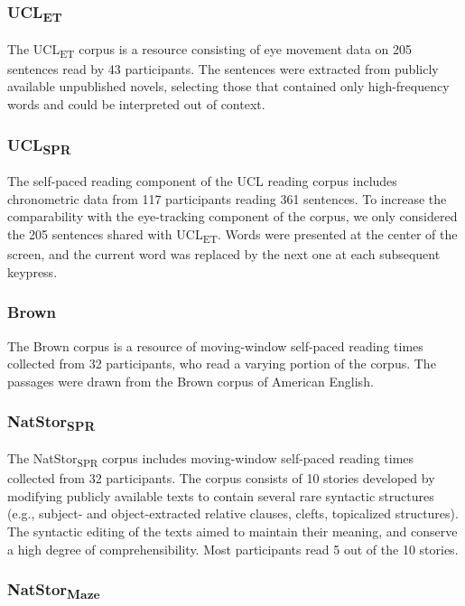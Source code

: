 \documentclass[11pt]{article}
\begin{document}
\subsubsection{UCL\textsubscript{ET}}

The UCL\textsubscript{ET} corpus \citep{et_spr_corpus} is a resource consisting of eye movement data on 205 sentences read by 43 participants. The sentences were extracted from publicly available unpublished novels, selecting those that contained only high-frequency words and could be interpreted out of context.

\subsubsection{UCL\textsubscript{SPR}}
The self-paced reading component of the UCL reading corpus \citep{et_spr_corpus} includes chronometric data from 117 participants reading 361 sentences. To increase the comparability with the eye-tracking component of the corpus, we only considered the 205 sentences shared with UCL\textsubscript{ET}. Words were presented at the center of the screen, and the current word was replaced by the next one at each subsequent keypress. 

\subsubsection{Brown}

The Brown corpus \citep{effectislogarithmic} is a resource of moving-window self-paced reading times collected from 32 participants, who read a varying portion of the corpus. The passages were drawn from the Brown corpus of American English. 

\subsubsection{NatStor\textsubscript{SPR}}

The NatStor\textsubscript{SPR} corpus \citep{futrell2021natural} includes moving-window self-paced reading times collected from 32 participants. The corpus consists of 10 stories developed by modifying publicly available texts to contain several rare syntactic structures (e.g., subject- and object-extracted relative clauses, clefts, topicalized structures). The syntactic editing of the texts aimed to maintain their meaning, and conserve a high degree of comprehensibility. Most participants read 5 out of the 10 stories. 

\subsubsection{NatStor\textsubscript{Maze}}
\end{document}

